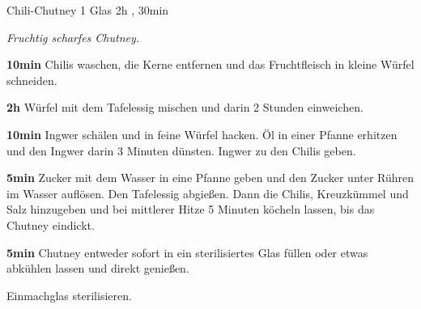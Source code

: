 \documentclass[../recipe-collections/cooking.tex]{subfiles}
\begin{document}
\begin{recipe}{Chili-Chutney} {1 Glas } {2h , 30min }

  \freeform{}\textit{Fruchtig scharfes Chutney.}


  \textbf{10min}
  Chilis waschen, die Kerne entfernen und das Fruchtfleisch in kleine Würfel schneiden.


  \textbf{2h}
  Würfel mit dem Tafelessig mischen und darin 2 Stunden einweichen.


  \textbf{10min}
  Ingwer schälen und in feine Würfel hacken.
  Öl in einer Pfanne erhitzen und den Ingwer darin 3 Minuten dünsten.
  Ingwer zu den Chilis geben.


  \textbf{5min}
  Zucker mit dem Wasser in eine Pfanne geben und den Zucker unter Rühren im Wasser auflösen.
  Den Tafelessig abgießen.
  Dann die Chilis, Kreuzkümmel und Salz hinzugeben und bei mittlerer Hitze 5 Minuten köcheln lassen, bis das Chutney eindickt.

  \newstep{}\textbf{5min}
  Chutney entweder sofort in ein sterilisiertes Glas füllen oder etwas abkühlen lassen und direkt genießen.

  \freeform{}\hrulefill{}

  \freeform{}
  Einmachglas sterilisieren.

\end{recipe}
\end{document}
